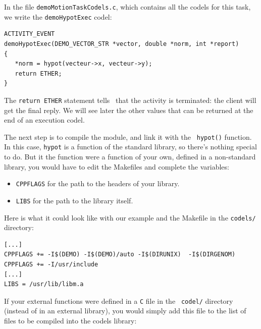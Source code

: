 In the file {\tt demoMotionTaskCodels.c}, which contains all the codels
for this task, we write the {\tt demoHypotExec} codel:

\begin{center}\begin{cartouche}\small\begin{verbatim}
ACTIVITY_EVENT
demoHypotExec(DEMO_VECTOR_STR *vector, double *norm, int *report)
{
   *norm = hypot(vecteur->x, vecteur->y);
   return ETHER;
}
\end{verbatim}\end{cartouche}\end{center}

The {\tt  return  ETHER} statement tells   \GenoM\ that  the  activity is
terminated: the client will  get the final  reply. We will see  later the
other values that can be returned at the end of an execution codel.

The next  step is to  compile the   module,  and link   it with the  {\tt
hypot()} function.  In  this  case, {\tt  hypot} is   a function of   the
standard library, so there's nothing special  to do.  But it the function
were a function of your own, defined in a non-standard library, you would
have to edit the Makefiles and complete the variables:

\begin{itemize}
\item {\tt CPPFLAGS} for the path to the headers of your library.
\item {\tt LIBS} for the path to the library itself.
\end{itemize}

Here is what it could look like with our example and the Makefile in the
{\tt codels/} directory:

\begin{center}\begin{cartouche}\small\begin{verbatim}
[...]
CPPFLAGS += -I$(DEMO) -I$(DEMO)/auto -I$(DIRUNIX)  -I$(DIRGENOM)
CPPFLAGS += -I/usr/include
[...]
LIBS = /usr/lib/libm.a
\end{verbatim}\end{cartouche}\end{center}

If your external functions  were defined in a  {\tt C}  file in the  {\tt
codel/} directory (instead of  in an external  library), you would simply
add this file to the   list  of files to  be   compiled into the   codels
library:

